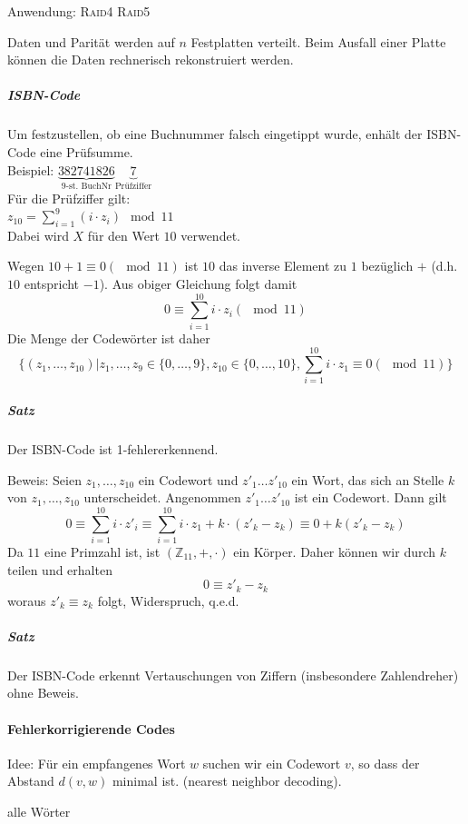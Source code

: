 \documentclass[a4paper]{scrartcl}
\begin{document}
Anwendung: \textsc{Raid4} \textsc{Raid5}

Daten und Parität werden auf $n$ Festplatten verteilt. Beim Ausfall einer Platte können die Daten rechnerisch rekonstruiert werden.

\subparagraph{\textsc{ISBN}-Code} Um festzustellen, ob eine Buchnummer falsch eingetippt wurde, enhält der \textsc{ISBN}-Code eine Prüfsumme.\\
Beispiel: $\underbrace{382741826}_{9\text{-st. BuchNr}}\underbrace{7}_{\text{Prüfziffer}}$\\
Für die Prüfziffer gilt:\\
$z_{10} = \sum\limits_{i=1}^{9} (i \cdot z_i ) \mod{11}$\\
Dabei wird $X$ für den Wert $10$ verwendet.

Wegen $10+1 \equiv 0 (\mod{11})$ ist $10$ das inverse Element zu $1$ bezüglich $+$ (d.h. $10$ entspricht $-1$). Aus obiger Gleichung folgt damit
\[ 0 \equiv \sum\limits_{i=1}^{10} i \cdot z_i (\mod{11})\]
Die Menge der Codewörter ist daher
\[\{ (z_1,\dots,z_{10}) | z_1,\dots,z_9 \in \{ 0,\dots,9\},z_{10} \in \{0,\dots,10\}, \sum\limits_{i=1}^{10} i \cdot z_1 \equiv 0 (\mod{11}) \}\]

\subparagraph{Satz} Der \textsc{ISBN}-Code ist 1-fehlererkennend.

Beweis: Seien $z_1,\dots,z_{10}$ ein Codewort und $z'_1 \dots z'_{10}$ ein Wort, das sich an Stelle $k$ von $z_1,\dots,z_{10}$ unterscheidet. Angenommen $z'_1 \dots z'_{10}$ ist ein Codewort. Dann gilt
\[0 \equiv \sum\limits_{i=1}^{10} i \cdot z'_i \equiv \sum\limits_{i=1}^{10} i \cdot z_1 + k \cdot (z'_k - z_k) \equiv 0 + k (z'_k - z_k)\]
Da $11$ eine Primzahl ist, ist $(\mathbb{Z}_{11},+,\cdot)$ ein Körper. Daher können wir durch $k$ teilen und erhalten
\[ 0 \equiv z'_k - z_k \]
woraus $z'_k \equiv z_k$ folgt, Widerspruch, q.e.d.

\subparagraph{Satz} Der \textsc{ISBN}-Code erkennt Vertauschungen von Ziffern (insbesondere Zahlendreher) ohne Beweis.

\paragraph{Fehlerkorrigierende Codes} Idee: Für ein empfangenes Wort $w$ suchen wir ein Codewort $v$, so dass der Abstand $d(v,w)$ minimal ist. (nearest neighbor decoding).

alle Wörter
\end{document}

